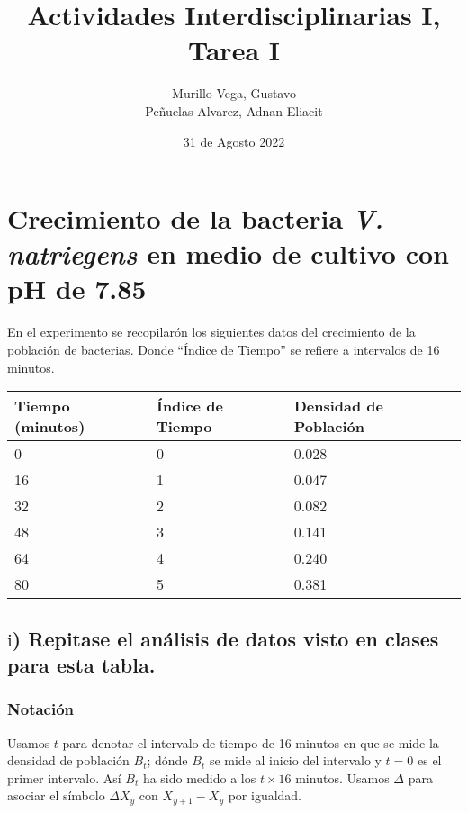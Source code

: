\documentclass[11pt]{article}
\title{Actividades Interdisciplinarias I, Tarea I}
\author{Murillo Vega, Gustavo\\ Peñuelas Alvarez, Adnan Eliacit}
\date{31 de Agosto 2022}
\begin{document}
    
    \maketitle
    
    

    
    \hypertarget{crecimiento-de-la-bacteria-v.-natriegens-en-medio-de-cultivo-con-ph-de-7.85}{%
\section{\texorpdfstring{Crecimiento de la bacteria \emph{V.
natriegens} en medio de cultivo con pH de
7.85}{1. Crecimiento de la bacteria V. natriegens en medio de cultivo con pH de 7.85}}\label{crecimiento-de-la-bacteria-v.-natriegens-en-medio-de-cultivo-con-ph-de-7.85}}

    En el experimento se recopilarón los siguientes datos del crecimiento
de la población de bacterias. Donde ``Índice de Tiempo'' se refiere a
intervalos de 16 minutos.

    \begin{longtable}[]{@{}lll@{}}
\toprule
Tiempo (minutos) & Índice de Tiempo & Densidad de Población \\
\midrule
\endhead
0 & 0 & 0.028 \\
16 & 1 & 0.047 \\
32 & 2 & 0.082 \\
48 & 3 & 0.141 \\
64 & 4 & 0.240 \\
80 & 5 & 0.381 \\
\bottomrule
\end{longtable}

    \hypertarget{mathrmi-repitase-el-anuxe1lisis-de-datos-visto-en-clases-para-esta-tabla.}{%
\subsection{\texorpdfstring{\(\mathrm{i}\)) Repitase el análisis de
datos visto en clases para esta
tabla.}{\textbackslash mathrm\{i\}) Repitase el análisis de datos visto en clases para esta tabla.}}\label{mathrmi-repitase-el-anuxe1lisis-de-datos-visto-en-clases-para-esta-tabla.}}

    \hypertarget{notaciuxf3n}{%
\subsubsection{Notación}\label{notaciuxf3n}}

Usamos \(t\) para denotar el intervalo de tiempo de 16 minutos en que se
mide la densidad de población \(B_t\); dónde \(B_t\) se mide al inicio
del intervalo y \(t=0\) es el primer intervalo. Así \(B_t\) ha sido
medido a los \(t\times 16\) minutos. Usamos \(\Delta\) para asociar el
símbolo \(\Delta X_y\) con \(X_{y+1}-X_y\) por igualdad.
\end{document}
